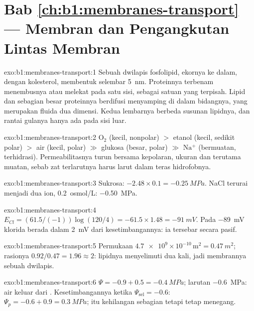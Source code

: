 \section*{Bab \ref{ch:b1:membranes-transport} --- Membran dan Pengangkutan Lintas Membran}

\begin{solution}{exo:b1:membranes-transport:1}
Sebuah dwilapis fosfolipid, ekornya ke dalam, dengan kolesterol,
membentuk selembar \qty{5}{nm}. Proteinnya terbenam menembusnya atau
melekat pada satu sisi, sebagai satuan yang terpisah. Lipid dan
sebagian besar proteinnya berdifusi menyamping di dalam bidangnya, yang
merupakan fluida dua dimensi. Kedua lembarnya berbeda susunan lipidnya,
dan rantai gulanya hanya ada pada sisi luar.
\end{solution}

\begin{solution}{exo:b1:membranes-transport:2}
$\mathrm{O_2}$ (kecil, nonpolar) $>$ etanol (kecil, sedikit polar)
$>$ air (kecil, polar) $\gg$ glukosa (besar, polar) $\gg$
$\mathrm{Na^+}$ (bermuatan, terhidrasi). Permeabilitasnya turun bersama
kepolaran, ukuran dan terutama muatan, sebab zat terlarutnya harus larut
dalam teras hidrofobnya.
\end{solution}

\begin{solution}{exo:b1:membranes-transport:3}
Sukrosa: $-2.48\times 0.1 = \qty{-0.25}{MPa}$. NaCl terurai menjadi dua
ion, \qty{0.2}{osmol/L}: \qty{-0.50}{MPa}.
\end{solution}

\begin{solution}{exo:b1:membranes-transport:4}
$E_{Cl} = (61.5/(-1))\log(120/4) = -61.5\times 1.48 = \qty{-91}{mV}$.
Pada \qty{-89}{mV} klorida berada dalam \qty{2}{mV} dari
kesetimbangannya: ia tersebar secara pasif.
\end{solution}

\begin{solution}{exo:b1:membranes-transport:5}
Permukaan  $\num{4.7e9}\times 10^{-10}\,\mathrm{m^2} =
\qty{0.47}{m^2}$; rasionya $0.92/0.47 = 1.96 \approx 2$: lipidnya
menyelimuti  dua kali, jadi membrannya sebuah dwilapis.
\end{solution}

\begin{solution}{exo:b1:membranes-transport:6}
 $\Psi = -0.9 + 0.5 = \qty{-0.4}{MPa}$; larutan \qty{-0.6}{MPa}: air
keluar dari . Kesetimbangannya ketika $\Psi_{\text{sel}} = -0.6$:
$\Psi_p = -0.6 + 0.9 = \qty{0.3}{MPa}$;  itu kehilangan sebagian
 tetapi tetap menegang.
\end{solution}

